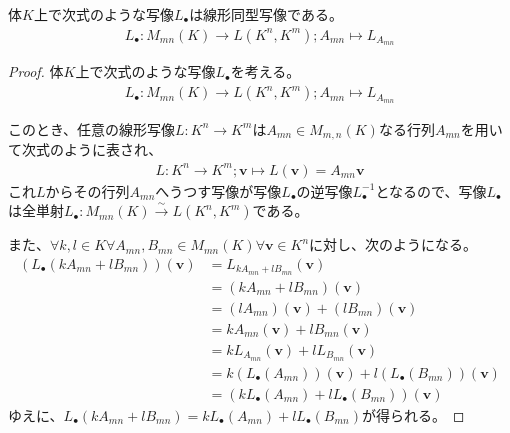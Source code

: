 \documentclass[dvipdfmx]{jsarticle}
\begin{document}
\begin{thm}\label{2.1.4.9}
体$K$上で次式のような写像$L_{\bullet}$は線形同型写像である。
\begin{align*}
L_{\bullet}:M_{mn}(K) \rightarrow L\left( K^{n},K^{m} \right);A_{mn} \mapsto L_{A_{mn}}
\end{align*}
\end{thm}
\begin{proof}体$K$上で次式のような写像$L_{\bullet}$を考える。
\begin{align*}
L_{\bullet}:M_{mn}(K) \rightarrow L\left( K^{n},K^{m} \right);A_{mn} \mapsto L_{A_{mn}}
\end{align*}\par
このとき、任意の線形写像$L:K^{n} \rightarrow K^{m}$は$A_{mn} \in M_{m,n}(K)$なる行列$A_{mn}$を用いて次式のように表され、
\begin{align*}
L:K^{n} \rightarrow K^{m};\mathbf{v} \mapsto L\left( \mathbf{v} \right) = A_{mn}\mathbf{v}
\end{align*}
これ$L$からその行列$A_{mn}$へうつす写像が写像$L_{\bullet}$の逆写像$L_{\bullet}^{- 1}$となるので、写像$L_{\bullet}$は全単射$L_{\bullet}:M_{mn}(K)\overset{\sim}{\rightarrow}L\left( K^{n},K^{m} \right)$である。\par
また、$\forall k,l \in K\forall A_{mn},B_{mn} \in M_{mn}(K)\forall\mathbf{v} \in K^{n}$に対し、次のようになる。
\begin{align*}
\left( L_{\bullet}\left( kA_{mn} + lB_{mn} \right) \right)\left( \mathbf{v} \right) &= L_{kA_{mn} + lB_{mn}}\left( \mathbf{v} \right)\\
&= \left( kA_{mn} + lB_{mn} \right)\left( \mathbf{v} \right)\\
&= \left( lA_{mn} \right)\left( \mathbf{v} \right) + \left( lB_{mn} \right)\left( \mathbf{v} \right)\\
&= kA_{mn}\left( \mathbf{v} \right) + lB_{mn}\left( \mathbf{v} \right)\\
&= kL_{A_{mn}}\left( \mathbf{v} \right) + lL_{B_{mn}}\left( \mathbf{v} \right)\\
&= k\left( L_{\bullet}\left( A_{mn} \right) \right)\left( \mathbf{v} \right) + l\left( L_{\bullet}\left( B_{mn} \right) \right)\left( \mathbf{v} \right)\\
&= \left( kL_{\bullet}\left( A_{mn} \right) + lL_{\bullet}\left( B_{mn} \right) \right)\left( \mathbf{v} \right)
\end{align*}
ゆえに、$L_{\bullet}\left( kA_{mn} + lB_{mn} \right) = kL_{\bullet}\left( A_{mn} \right) + lL_{\bullet}\left( B_{mn} \right)$が得られる。
\end{proof}
\end{document}
